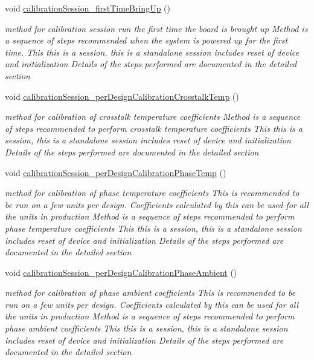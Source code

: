 \begin{DoxyCompactItemize}
void \mbox{\hyperlink{class_o_p_t3101_1_1device_a0dd8c59bc93c392f8d3f430697457415}{calibration\+Session\+\_\+first\+Time\+Bring\+Up}} ()
\begin{DoxyCompactList}\small\item\em method for calibration session run the first time the board is brought up Method is a sequence of steps recommended when the system is powered up for the first time. This this is a session, this is a standalone session includes reset of device and initialization Details of the steps performed are documented in the detailed section \end{DoxyCompactList}\item 
void \mbox{\hyperlink{class_o_p_t3101_1_1device_a6b44ee9769ae8a2debff7b475bccdfe4}{calibration\+Session\+\_\+per\+Design\+Calibration\+Crosstalk\+Temp}} ()
\begin{DoxyCompactList}\small\item\em method for calibration of crosstalk temperature coefficients Method is a sequence of steps recommended to perform crosstalk temperature coefficients This this is a session, this is a standalone session includes reset of device and initialization Details of the steps performed are documented in the detailed section \end{DoxyCompactList}\item 
void \mbox{\hyperlink{class_o_p_t3101_1_1device_aec05fdf2f9780dea74305720ccb1cf32}{calibration\+Session\+\_\+per\+Design\+Calibration\+Phase\+Temp}} ()
\begin{DoxyCompactList}\small\item\em method for calibration of phase temperature coefficients This is recommended to be run on a few units per design. Coefficients calculated by this can be used for all the units in production Method is a sequence of steps recommended to perform phase temperature coefficients This this is a session, this is a standalone session includes reset of device and initialization Details of the steps performed are documented in the detailed section \end{DoxyCompactList}\item 
void \mbox{\hyperlink{class_o_p_t3101_1_1device_a94c4e35aa43bc53eb8fe0d4c364aea25}{calibration\+Session\+\_\+per\+Design\+Calibration\+Phase\+Ambient}} ()
\begin{DoxyCompactList}\small\item\em method for calibration of phase ambient coefficients This is recommended to be run on a few units per design. Coefficients calculated by this can be used for all the units in production Method is a sequence of steps recommended to perform phase ambient coefficients This this is a session, this is a standalone session includes reset of device and initialization Details of the steps performed are documented in the detailed section \end{DoxyCompactList}\item 

\end{DoxyCompactItemize}
